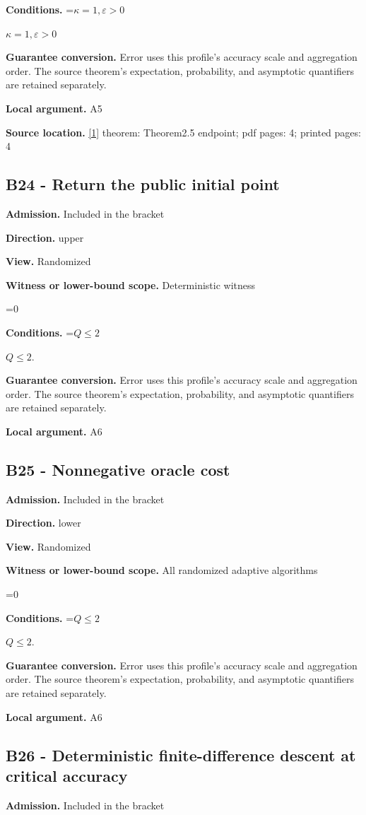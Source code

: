 \documentclass[10pt,a4paper]{article}
\newcommand{\AtlasMath}[1]{\par\begingroup\centering\setbox0=\hbox{$\displaystyle #1$}\ifdim\wd0>1.4\linewidth\typeout{ATLAS WIDE FORMULA: \the\wd0}\fi\ifdim\wd0>\linewidth\resizebox{\linewidth}{!}{\box0}\else\box0\fi\par\endgroup}
\newcommand{\AtlasInlineMath}[1]{\begingroup\setbox0=\hbox{$#1$}\ifdim\wd0>.4\linewidth\endgroup\AtlasMath{#1}\else\endgroup$#1$\fi}
\begin{document}
\textbf{Conditions.} \AtlasInlineMath{\kappa=1,\varepsilon>0}

\textbf{Guarantee conversion.} Error uses this profile's accuracy scale and aggregation order. The source theorem's expectation, probability, and asymptotic quantifiers are retained separately.

\textbf{Local argument.} A5

\textbf{Source location.} \href{https://arxiv.org/html/2610.00345v1}{[1]} theorem: Theorem2.5 endpoint; pdf pages: 4; printed pages: 4

\subsection{B24 - Return the public initial point}
\textbf{Admission.} Included in the bracket

\textbf{Direction.} upper

\textbf{View.} Randomized

\textbf{Witness or lower-bound scope.} Deterministic witness

\AtlasMath{0}
\textbf{Conditions.} \AtlasInlineMath{Q\le2}.

\textbf{Guarantee conversion.} Error uses this profile's accuracy scale and aggregation order. The source theorem's expectation, probability, and asymptotic quantifiers are retained separately.

\textbf{Local argument.} A6

\subsection{B25 - Nonnegative oracle cost}
\textbf{Admission.} Included in the bracket

\textbf{Direction.} lower

\textbf{View.} Randomized

\textbf{Witness or lower-bound scope.} All randomized adaptive algorithms

\AtlasMath{0}
\textbf{Conditions.} \AtlasInlineMath{Q\le2}.

\textbf{Guarantee conversion.} Error uses this profile's accuracy scale and aggregation order. The source theorem's expectation, probability, and asymptotic quantifiers are retained separately.

\textbf{Local argument.} A6

\subsection{B26 - Deterministic finite-difference descent at critical accuracy}
\textbf{Admission.} Included in the bracket
\end{document}
